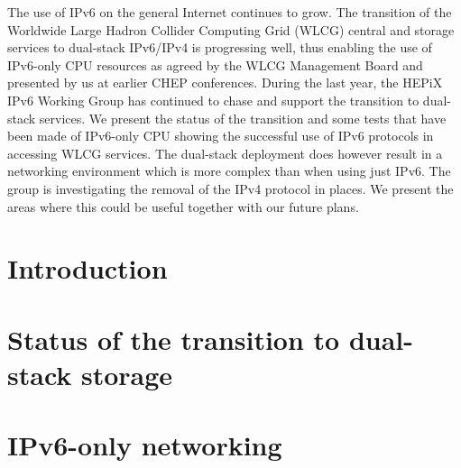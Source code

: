 \documentclass{webofc}
\begin{document}
\abstract
{The use of IPv6 on the general Internet continues to grow.
The transition of the Worldwide Large Hadron Collider Computing Grid 
(WLCG) central and storage services to dual-stack IPv6/IPv4 is progressing well,
thus enabling the use of IPv6-only CPU resources as agreed by the WLCG
Management Board and presented by us at earlier CHEP conferences.
During the last year, the HEPiX IPv6 Working Group has continued to chase
and support the transition to dual-stack services.
We present the status of the transition and some tests that have been made of IPv6-only CPU
showing the successful use of IPv6 protocols in accessing WLCG services.
The dual-stack deployment does however result in a networking environment
which is more complex than when using just IPv6. The group is investigating the removal of the IPv4 protocol in
places. We present the areas where this could be useful together with our future plans.}
\maketitle
\section{Introduction}
\label{sec-intro}

\section{Status of the transition to dual-stack storage}
\label{sec-trans}

\section{IPv6-only networking}
\label{sec-onlysix}

\end{document}
